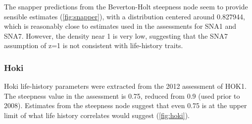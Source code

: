 \documentclass{dragonfly-report}\usepackage[]{graphicx}\usepackage[]{color}
\begin{document}
The snapper predictions from the Beverton-Holt steepness node seem to provide sensible estimates (\autoref{fig:snapper}), with a distribution centered around 0.827944, which is reasonably close to estimates used in the assessments for SNA1 and SNA7. However, the density near 1 is very low, suggesting that the SNA7 assumption of z=1 is not consistent with life-history traits.

\subsubsection{Hoki}

Hoki life-history parameters were extracted from the 2012 assessment of HOK1. The steepness value in the assessment is 0.75, reduced from 0.9 (used prior to 2008). Estimates from the steepness node suggest that even 0.75 is at the upper limit of what life history correlates would suggest (\autoref{fig:hoki}).
\end{document}
